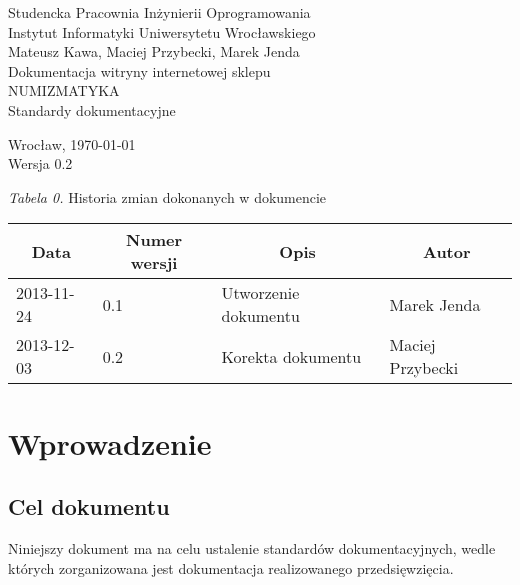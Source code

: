 \documentclass [11pt, a4paper, leqno]	{article}	%
\begin{document}

\begin{center}
	\thispagestyle{empty} 							%
	{\large Studencka Pracownia Inżynierii Oprogramowania} 		\\ [0.5cm]
	{\large Instytut Informatyki Uniwersytetu Wrocławskiego} 	\\ [6.0cm]

	{\large Mateusz Kawa, Maciej Przybecki, Marek Jenda} 		\\ [1.5cm]

	{\huge Dokumentacja witryny internetowej sklepu} 			\\ [0.5cm]
	{\huge NUMIZMATYKA} 										\\ [1.5cm]

	{\large Standardy dokumentacyjne} 							\\ [0.5cm]

	\vfill
	
	{\large Wrocław, \today}									\\ [0.5cm]
	{\large Wersja 0.2}
\end{center}

\newpage


\textit{Tabela 0.} Historia zmian dokonanych w dokumencie

\begin{center}
	\begin{tabular}{| l | l | l | l |}
		\hline
		\multicolumn{1}{|c|}{Data} & 
		\multicolumn{1}{|c|}{Numer wersji} &  
		\multicolumn{1}{|c|}{Opis} &
		\multicolumn{1}{|c|}{Autor} \\ \hline \hline
		2013-11-24 & 0.1 & Utworzenie dokumentu & Marek Jenda \\ \hline
		2013-12-03 & 0.2 & Korekta dokumentu & Maciej Przybecki \\ \hline
	\end{tabular}
\end{center}

\newpage


\tableofcontents

\newpage

\section{Wprowadzenie}

\subsection{Cel dokumentu}
\noindent
Niniejszy dokument ma na celu ustalenie standardów dokumentacyjnych, wedle których zorganizowana jest dokumentacja realizowanego przedsięwzięcia.
\end{document}
